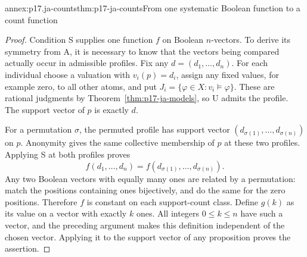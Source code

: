 \begin{annexitem}{annex:p17.ja-counts}{thm:p17-ja-counts}{From one systematic Boolean function to a count function}
\begin{proof}
Condition S supplies one function \(f\) on Boolean \(n\)-vectors. To derive
its symmetry from A, it is necessary to know that the vectors being compared
actually occur in admissible profiles. Fix any \(d=(d_1,\ldots,d_n)\).
For each individual choose a valuation with \(v_i(p)=d_i\), assign any fixed
values, for example zero, to all other atoms, and put
\(J_i=\{\varphi\in X:v_i\models\varphi\}\).
These are rational judgments by Theorem~\ref{thm:p17-ja-models}, so U admits
the profile. The support vector of \(p\) is exactly \(d\).

For a permutation \(\sigma\), the permuted profile has support vector
\((d_{\sigma(1)},\ldots,d_{\sigma(n)})\) on \(p\).
Anonymity gives the same collective membership of \(p\) at these two
profiles. Applying S at both profiles proves
\[
 f(d_1,\ldots,d_n)=f(d_{\sigma(1)},\ldots,d_{\sigma(n)}).
\]
Any two Boolean vectors with equally many ones are related by a permutation:
match the positions containing ones bijectively, and do the same for the zero
positions. Therefore \(f\) is constant on each support-count class. Define
\(g(k)\) as its value on a vector with exactly \(k\) ones. All integers
\(0\leq k\leq n\) have such a vector, and the preceding argument makes
this definition independent of the chosen vector. Applying it to the support
vector of any proposition proves the assertion.
\end{proof}
\end{annexitem}

